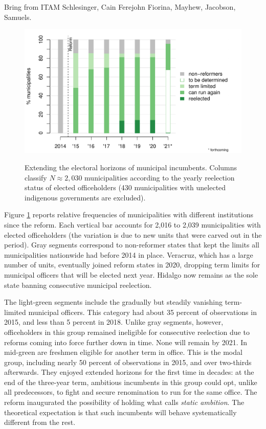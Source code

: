\documentclass[letter,12pt]{article}
\begin{document}
Bring from ITAM Schlesinger, Cain Ferejohn Fiorina, Mayhew, Jacobson, Samuels. 

\begin{figure}
  \centering
  \includegraphics[width=.85\columnwidth]{../graph/horizon-yrs.pdf} \\
  \caption{Extending the electoral horizons of municipal incumbents. Columns classify $N \approx 2,030$ municipalities according to the yearly reelection status of elected officeholders (430 municipalities with unelected indigenous governments are excluded).}\label{F:horizons}
\end{figure}

Figure \ref{F:horizons} reports relative frequencies of municipalities with different institutions since the reform. Each vertical bar accounts for 2,016 to 2,039 municipalities with elected officeholders (the variation is due to new units that were carved out in the period). Gray segments correspond to non-reformer states that kept the limits all municipalities nationwide had before 2014 in place. Veracruz, which has a large number of units, eventually joined reform states in 2020, dropping term limits for municipal officers that will be elected next year. Hidalgo now remains as the sole state banning consecutive municipal reelection. 

The light-green segments include the gradually but steadily vanishing term-limited municipal officers. This category had about 35 percent of observations in 2015, and less than 5 percent in 2018. Unlike gray segments, however, officeholders in this group remained ineligible for consecutive reelection due to reforms coming into force further down in time. None will remain by 2021. In mid-green are freshmen eligible for another term in office. This is the modal group, including nearly 50 percent of observations in 2015, and over two-thirds afterwards. They enjoyed extended horizons for the first time in decades: at the end of the three-year term, ambitious incumbents in this group could opt, unlike all predecessors, to fight and secure renomination to run for the same office. The reform inaugurated the possibility of holding what \citet{schlesinger.1966} calls \emph{static ambition}. The theoretical expectation is that such incumbents will behave systematically different from the rest. 
\end{document}
